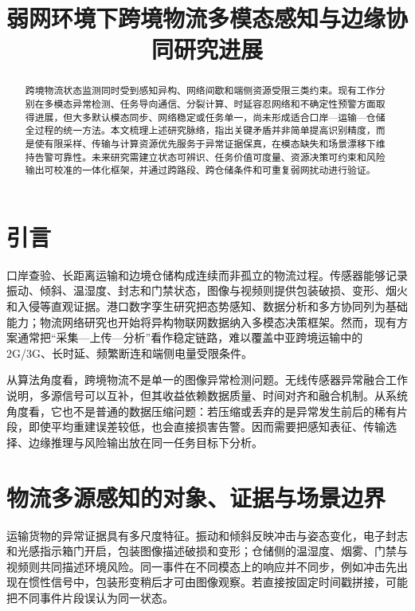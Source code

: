 \documentclass[11pt,a4paper]{article}
\title{弱网环境下跨境物流多模态感知与边缘协同研究进展}
\author{}
\date{}
\begin{document}
\maketitle

\begin{abstract}
跨境物流状态监测同时受到感知异构、网络间歇和端侧资源受限三类约束。现有工作分别在多模态异常检测、任务导向通信、分裂计算、时延容忍网络和不确定性预警方面取得进展，但大多默认模态同步、网络稳定或任务单一，尚未形成适合口岸—运输—仓储全过程的统一方法。本文梳理上述研究脉络，指出关键矛盾并非简单提高识别精度，而是使有限采样、传输与计算资源优先服务于异常证据保真，在模态缺失和场景漂移下维持告警可靠性。未来研究需建立状态可辨识、任务价值可度量、资源决策可约束和风险输出可校准的一体化框架，并通过跨路段、跨仓储条件和可重复弱网扰动进行验证。
\end{abstract}

\section{引言}

口岸查验、长距离运输和边境仓储构成连续而非孤立的物流过程。传感器能够记录振动、倾斜、温湿度、封志和门禁状态，图像与视频则提供包装破损、变形、烟火和入侵等直观证据。港口数字孪生研究把态势感知、数据分析和多方协同列为基础能力\cite{digitaltwinsfor2023}；物流网络研究也开始将异构物联网数据纳入多模态决策框架\cite{amultimodaldeep2025}。然而，现有方案通常把“采集—上传—分析”看作稳定链路，难以覆盖中亚跨境运输中的 2G/3G、长时延、频繁断连和端侧电量受限条件。

从算法角度看，跨境物流不是单一的图像异常检测问题。无线传感器异常融合工作说明，多源信号可以互补，但其收益依赖数据质量、时间对齐和融合机制\cite{multimodalfusionanomaly2024}。从系统角度看，它也不是普通的数据压缩问题：若压缩或丢弃的是异常发生前后的稀有片段，即使平均重建误差较低，也会直接损害告警。因而需要把感知表征、传输选择、边缘推理与风险输出放在同一任务目标下分析。

\section{物流多源感知的对象、证据与场景边界}

运输货物的异常证据具有多尺度特征。振动和倾斜反映冲击与姿态变化，电子封志和光感指示箱门开启，包装图像描述破损和变形；仓储侧的温湿度、烟雾、门禁与视频则共同描述环境风险。同一事件在不同模态上的响应并不同步，例如冲击先出现在惯性信号中，包装形变稍后才可由图像观察。若直接按固定时间戳拼接，可能把不同事件片段误认为同一状态。
\end{document}
